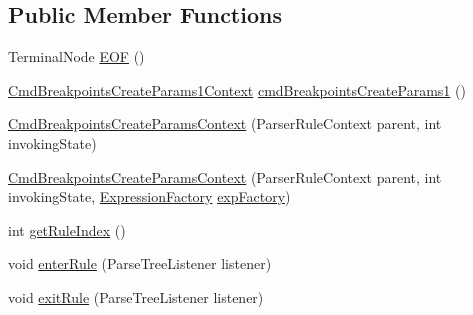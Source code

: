 \subsection*{Public Member Functions}
\begin{DoxyCompactItemize}
\item 
Terminal\+Node \hyperlink{classgov_1_1nasa_1_1jpf_1_1inspector_1_1server_1_1expression_1_1parser_1_1_expression_grammar_pa40092569cc5b197b7a5caae27da04e05_aa1dc88e3aaba9ef61b92e806316c4347}{E\+OF} ()
\item 
\hyperlink{classgov_1_1nasa_1_1jpf_1_1inspector_1_1server_1_1expression_1_1parser_1_1_expression_grammar_pa96543943a9acc7eb3cd37320a4fc3ee4}{Cmd\+Breakpoints\+Create\+Params1\+Context} \hyperlink{classgov_1_1nasa_1_1jpf_1_1inspector_1_1server_1_1expression_1_1parser_1_1_expression_grammar_pa40092569cc5b197b7a5caae27da04e05_a59e06ca5f98a6d7c341c663e0046f812}{cmd\+Breakpoints\+Create\+Params1} ()
\item 
\hyperlink{classgov_1_1nasa_1_1jpf_1_1inspector_1_1server_1_1expression_1_1parser_1_1_expression_grammar_pa40092569cc5b197b7a5caae27da04e05_a60cba88ee2a63b07da6135a6e7f06488}{Cmd\+Breakpoints\+Create\+Params\+Context} (Parser\+Rule\+Context parent, int invoking\+State)
\item 
\hyperlink{classgov_1_1nasa_1_1jpf_1_1inspector_1_1server_1_1expression_1_1parser_1_1_expression_grammar_pa40092569cc5b197b7a5caae27da04e05_ab4cacd1b463f0d6ef8f361b3ddbbaba8}{Cmd\+Breakpoints\+Create\+Params\+Context} (Parser\+Rule\+Context parent, int invoking\+State, \hyperlink{classgov_1_1nasa_1_1jpf_1_1inspector_1_1server_1_1expression_1_1_expression_factory}{Expression\+Factory} \hyperlink{classgov_1_1nasa_1_1jpf_1_1inspector_1_1server_1_1expression_1_1parser_1_1_expression_grammar_pa40092569cc5b197b7a5caae27da04e05_a793e80f9b9fc9776ffe215c2b57b09c5}{exp\+Factory})
\item 
int \hyperlink{classgov_1_1nasa_1_1jpf_1_1inspector_1_1server_1_1expression_1_1parser_1_1_expression_grammar_pa40092569cc5b197b7a5caae27da04e05_aa765d0eaad36697cf267e9c0e6f18a67}{get\+Rule\+Index} ()
\item 
void \hyperlink{classgov_1_1nasa_1_1jpf_1_1inspector_1_1server_1_1expression_1_1parser_1_1_expression_grammar_pa40092569cc5b197b7a5caae27da04e05_af19ed9d7b7cc5017b83dca5d0c4ddf54}{enter\+Rule} (Parse\+Tree\+Listener listener)
\item 
void \hyperlink{classgov_1_1nasa_1_1jpf_1_1inspector_1_1server_1_1expression_1_1parser_1_1_expression_grammar_pa40092569cc5b197b7a5caae27da04e05_a9a9a4a9a7e5120b1c7060454c0688485}{exit\+Rule} (Parse\+Tree\+Listener listener)
\end{DoxyCompactItemize}
